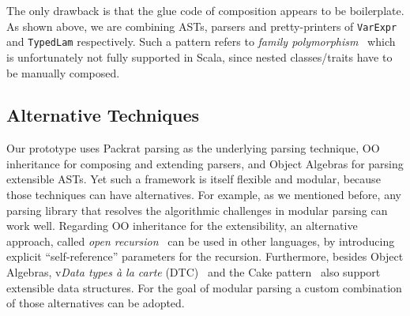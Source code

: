 The only drawback is that the glue code of composition appears to be
boilerplate. As shown above, we are combining ASTs, parsers and
pretty-printers of \lstinline{VarExpr} and \lstinline{TypedLam}
respectively. Such a pattern refers to \textit{family
  polymorphism}~\cite{ernst01FP} which is unfortunately not fully supported
in Scala, since nested classes/traits have to be manually composed.

\subsection{Alternative Techniques}

Our prototype uses Packrat parsing as the underlying parsing technique, OO inheritance for composing and extending parsers, and Object Algebras for parsing extensible ASTs. Yet such a framework is itself flexible and modular, because those techniques can have alternatives.
For example, as we mentioned before, any parsing library
that resolves the algorithmic challenges in modular parsing can work well. Regarding OO inheritance for the extensibility, an alternative approach, called \textit{open recursion}~\cite{CookThesis} can be used in other languages, by introducing explicit ``self-reference'' parameters for the recursion. Furthermore, besides Object Algebras, v\textit{Data types à la carte} (DTC)~\cite{swierstra2008data} and the Cake pattern~\cite{odersky2005independently} also support extensible data structures. For the goal of modular parsing a custom combination of those alternatives can be adopted.
